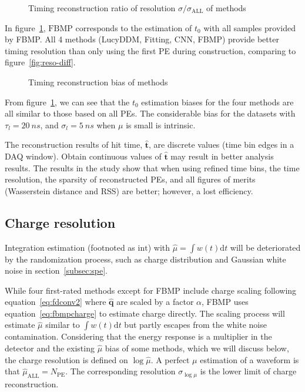\begin{figure}[H]
    \centering
    \resizebox{\textwidth}{!}{}
    \caption{\label{fig:deltamethods} Timing reconstruction ratio of resolution $\sigma/\sigma_{\mathrm{ALL}}$ of methods}
\end{figure}

In figure~\ref{fig:deltamethods}, $\mathrm{FBMP}$ corresponds to the estimation of $t_{0}$ with all samples provided by FBMP. All 4 methods (LucyDDM, Fitting, CNN, FBMP) provide better timing resolution than only using the first PE during construction, comparing to figure~\ref{fig:reso-diff}. 

\begin{figure}[H]
    \centering
    \resizebox{\textwidth}{!}{}
    \caption{\label{fig:biasmethods}Timing reconstruction bias of methods}
\end{figure}

From figure~\ref{fig:deltamethods}, we can see that the $t_0$ estimation biases for the four methods are all similar to those based on all PEs. The considerable bias for the datasets with $\tau_l=\SI{20}{ns}$, and $\sigma_l=\SI{5}{ns}$ when $\mu$ is small is intrinsic. 


The reconstruction results of hit time, $\bm{\hat{t}}$, are discrete values (time bin edges in a DAQ window). Obtain continuous values of $\bm{\hat{t}}$ may result in better analysis results. The results in the study show that when using refined time bins, the time resolution, the sparsity of reconstructed PEs, and all figures of merits (Wasserstein distance and RSS) are better; however, a lost efficiency. 

\subsection{Charge resolution}
\label{subsec:chargereconstruction}

Integration estimation (footnoted as $\mathrm{int}$) with $\hat{\mu}=\int w(t)\mathrm{d}t$ will be deteriorated by the randomization process, such as charge distribution and Gaussian white noise in section~\ref{subsec:spe}. 

While four first-rated methods except for FBMP include charge scaling following equation~\eqref{eq:fdconv2} where $\bm{\hat{q}}$ are scaled by a factor $\alpha$, FBMP uses equation~\eqref{eq:fbmpcharge} to estimate charge directly. The scaling process will estimate $\hat{\mu}$ similar to $\int w(t)\mathrm{d}t$ but partly escapes from the white noise contamination. Considering that the energy response is a multiplier in the detector and the existing $\hat{\mu}$ bias of some methods, which we will discuss below, the charge resolution is defined on $\log{\hat{\mu}}$. A perfect $\mu$ estimation of a waveform is that $\hat{\mu}_\mathrm{ALL}=N_\mathrm{PE}$. The corresponding resolution $\sigma_{\log\mu}$ is the lower limit of charge reconstruction. 

